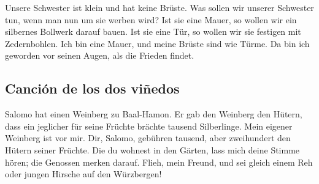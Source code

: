  Unsere Schwester ist klein und hat keine Brüste. Was
sollen wir unserer Schwester tun, wenn man nun um sie werben wird?
 Ist sie eine Mauer, so wollen wir ein silbernes Bollwerk
darauf bauen. Ist sie eine Tür, so wollen wir sie festigen mit
Zedernbohlen.  Ich bin eine Mauer, und meine Brüste sind
wie Türme. Da bin ich geworden vor seinen Augen, als die Frieden findet.

\hypertarget{canciuxf3n-de-los-dos-viuxf1edos}{%
\subsection{Canción de los dos
viñedos}\label{canciuxf3n-de-los-dos-viuxf1edos}}

 Salomo hat einen Weinberg zu Baal-Hamon. Er gab den
Weinberg den Hütern, dass ein jeglicher für seine Früchte brächte
tausend Silberlinge.  Mein eigener Weinberg ist vor mir.
Dir, Salomo, gebühren tausend, aber zweihundert den Hütern seiner
Früchte.  Die du wohnest in den Gärten, lass mich deine
Stimme hören; die Genossen merken darauf.  Flieh, mein
Freund, und sei gleich einem Reh oder jungen Hirsche auf den Würzbergen!
